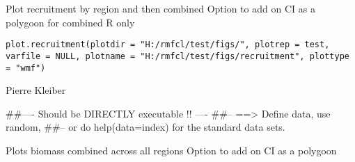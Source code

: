 \documentclass[a4paper]{book}
\begin{document}
%
\begin{Description}\relax

Plot recruitment by region and then combined
Option to add on CI as a polygoon for combined R only
\end{Description}
%
\begin{Usage}
\begin{verbatim}
plot.recruitment(plotdir = "H:/rmfcl/test/figs/", plotrep = test, varfile = NULL, plotname = "H:/rmfcl/test/figs/recruitment", plottype = "wmf")
\end{verbatim}
\end{Usage}
%
\begin{Arguments}
\begin{ldescription}
\item[\code{plotdir}] 


\item[\code{plotrep}] 


\item[\code{varfile}] 


\item[\code{plotname}] 


\item[\code{plottype}] 


\end{ldescription}
\end{Arguments}
%
\begin{Author}\relax

Pierre Kleiber
\end{Author}
%
\begin{Examples}
\begin{ExampleCode}
##---- Should be DIRECTLY executable !! ----
##-- ==>  Define data, use random,
##--	or do  help(data=index)  for the standard data sets.

\end{ExampleCode}
\end{Examples}
%
\begin{Description}\relax

Plots biomass combined across all regions
Option to add on CI as a polygoon
\end{Description}
\end{document}
